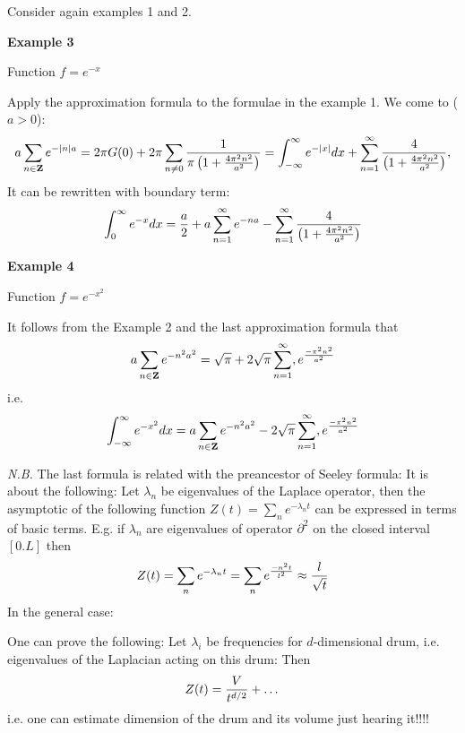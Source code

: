 Consider again examples  1 and 2.


{\bf Example 3}

  Function $f=e^{-x}$

Apply the approximation formula to the formulae in the example 1. We come to  ($a>0$):
                       $$
                       a\sum_{n\in {\bf Z}}e^{-|n|a}=2\pi G(0)+
         2\pi \sum_{n\not=0}{1\over \pi\left(1+{4\pi^2 n^2\over  a^2}\right)}=
\int_{-\infty}^\infty e^{-|x|}dx+
\sum_{n=1}^\infty{4\over \left(1+{4\pi^2 n^2\over  a^2}\right)},
                      $$
   It can be rewritten with boundary term:
                $$
     \int_0^\infty e^{-x}dx={a\over 2}+a\sum_{n=1}^\infty e^{-na}-
     \sum_{n=1}^\infty{4\over \left(1+{4\pi^2 n^2\over  a^2}\right)}
                     $$

{\bf Example 4}

  Function $f=e^{-x^2}$

It follows from the Example 2  and the last approximation formula that
                   $$
                   a\sum_{n\in {\bf Z}}e^{-n^2a^2}=
\sqrt {\pi}+2\sqrt\pi\sum_{n=1}^\infty,
    e^{-\pi^2 n^2\over a^2}
                   $$
i.e.
                $$
   \int_{-\infty}^\infty e^{-x^2}dx=a\sum_{n\in {\bf Z}}e^{-n^2a^2}-2\sqrt\pi\sum_{n=1}^\infty,
    e^{-\pi^2 n^2\over a^2}
                $$


{\it N.B.}  The last formula is related with the preancestor  of Seeley formula:
  It is about the following: Let $\lambda_n$ be eigenvalues of the Laplace operator,
  then the asymptotic of the following function $Z(t)=\sum_n e^{-\lambda_nt}$
  can be expressed in terms of basic terms. E.g. if $\lambda_n$ are eigenvalues of operator
  $\partial^2$ on the closed interval $[0.L]$  then
                 $$
    Z(t)=\sum_n e^{-\lambda_nt}=\sum_n e^{-n^2 t\over l^2}\approx {l\over \sqrt t}
                 $$
In the general case:


 One can prove the following: Let ${\lambda_i}$  be frequencies  for
$d$-dimensional drum, i.e. eigenvalues of the Laplacian acting on this drum:
Then
                      $$
                      Z(t)={V\over t^{d/2}}+\dots
                      $$
i.e. one can estimate dimension of the drum and its volume just hearing it!!!!



\bye
